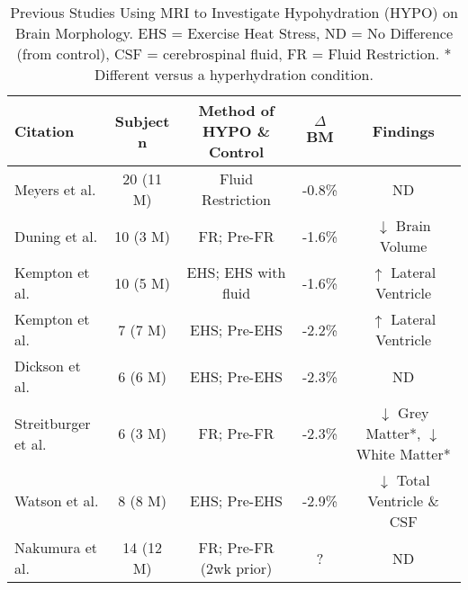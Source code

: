 \begin{table}
	\caption{Previous Studies Using MRI to Investigate Hypohydration (HYPO) on Brain Morphology. EHS = Exercise Heat Stress, ND = No Difference (from control), CSF = cerebrospinal fluid, FR = Fluid Restriction. * Different versus a hyperhydration condition.}
	\begin{center}
		
		\begin{tabular}{lcccc} 
			\hline
			\footnotesize\textbf{Citation} & \footnotesize\textbf{Subject n} & \footnotesize\textbf{Method of HYPO \& Control} & \textbf{${\Delta}$ BM} & \footnotesize\textbf{Findings} \\
			\hline
			
			\footnotesize Meyers et al. \cite{meyers_does_2016} & \footnotesize 20 \scriptsize(11 M) & \footnotesize Fluid Restriction & \footnotesize -0.8\% & \footnotesize ND \\
			
			\footnotesize Duning et al. \cite{duning_dehydration_2005} & \footnotesize 10 \scriptsize(3 M) & \footnotesize FR; Pre-FR & \footnotesize -1.6\% & \footnotesize ${\downarrow}$ Brain Volume \\
			
			\footnotesize Kempton et al. \cite{kempton_dehydration_2011} & \footnotesize 10 \scriptsize(5 M) & \footnotesize EHS; EHS with fluid & \footnotesize -1.6\% & \footnotesize ${\uparrow}$ \footnotesize Lateral Ventricle \\
			
			\footnotesize Kempton et al. \cite{kempton_effects_2009} & \footnotesize 7 \scriptsize(7 M) & \footnotesize EHS; Pre-EHS & \footnotesize -2.2\% & \footnotesize ${\uparrow}$ \footnotesize Lateral Ventricle \\
			
			\footnotesize Dickson et al. \cite{dickson_effects_2005} & \footnotesize 6 \scriptsize(6 M) & \footnotesize EHS; Pre-EHS & \footnotesize -2.3\% & \footnotesize ND \\
			
			\footnotesize Streitburger et al. \cite{streitburger_investigating_2012} & \footnotesize 6 \scriptsize(3 M) & \footnotesize FR; Pre-FR & \footnotesize -2.3\% & \footnotesize ${\downarrow}$ Grey Matter*, ${\downarrow}$ White Matter* \\
			
			\footnotesize Watson et al. \cite{watson_effect_2010} & \footnotesize 8 \scriptsize(8 M) & \footnotesize EHS; Pre-EHS & \footnotesize -2.9\% & \footnotesize ${\downarrow}$ Total Ventricle \& CSF \\
			
			\footnotesize Nakumura et al. \cite{nakamura_correlation_2014} & \footnotesize 14 \scriptsize(12 M) & \footnotesize FR; Pre-FR \scriptsize(2wk prior) & \footnotesize ? & \footnotesize ND \\	
			\hline
			
		\end{tabular}
		\label{tbl:mri_deh}
	\end{center}
\end{table}


